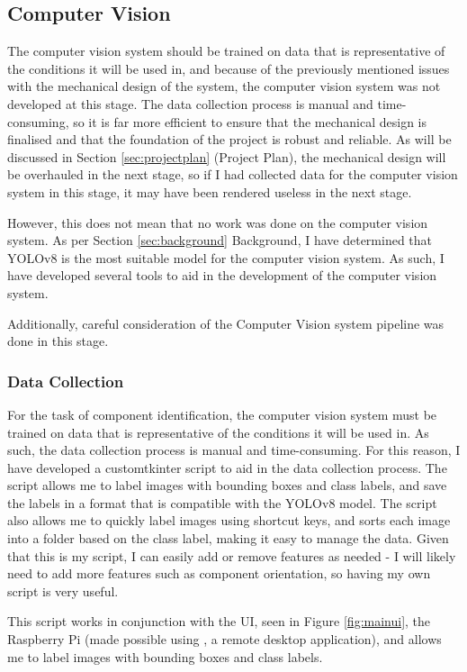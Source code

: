 \subsection{Computer Vision}
The computer vision system should be trained on data that is representative of the conditions it will be used in, and because
of the previously mentioned issues with the mechanical design of the system, the computer vision system was not developed at this stage.
The data collection process is manual and time-consuming, so it is far more efficient to ensure that the mechanical design is
finalised and that the foundation of the project is robust and reliable. As will be discussed in Section \ref*{sec:projectplan} (Project Plan), 
the mechanical design will be overhauled in the next stage, so if I had collected data for the computer vision system in this stage,
it may have been rendered useless in the next stage.

However, this does not mean that no work was done on the computer vision system. As per Section \ref*{sec:background} {Background},
I have determined that YOLOv8 is the most suitable model for the computer vision system. As such, I have developed several
tools to aid in the development of the computer vision system.

Additionally, careful consideration of the Computer Vision system pipeline was done in this stage. 

\subsubsection{Data Collection}
For the task of component identification, the computer vision system must be trained on data that is representative of the conditions
it will be used in. As such, the data collection process is manual and time-consuming. For this reason, I have developed a customtkinter\cite{customtkinter} script to aid in the data collection process.
The script allows me to label images with bounding boxes and class labels, and save the labels in a format that is compatible with
the YOLOv8 model. The script also allows me to quickly label images using shortcut keys, and sorts each image into a folder based on
the class label, making it easy to manage the data. Given that this is my script, I can easily add or remove features as needed - I will likely
need to add more features such as component orientation, so having my own script is very useful.

This script works in conjunction with the UI, seen in Figure \ref*{fig:mainui}, the Raspberry Pi (made possible using \citet{realvnc}, a remote desktop application),
and allows me to label images with bounding boxes and class labels.

